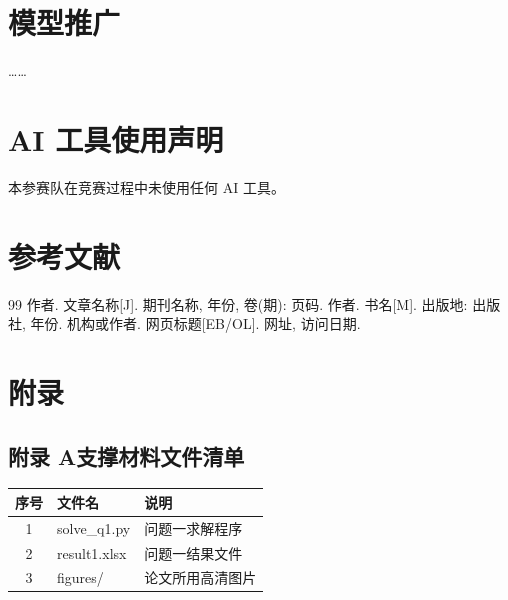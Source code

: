 \documentclass[12pt, a4paper]{ctexart}
\newcommand{\wuhao}{\fontsize{10.5pt}{13pt}\selectfont}  %
\begin{document}
\section{模型推广}
……

\section*{AI 工具使用声明}

本参赛队在竞赛过程中未使用任何 AI 工具。


\section*{参考文献}

{\songti\wuhao
\begin{thebibliography}{99}
  \setlength{\itemsep}{0pt}
   作者. 文章名称[J]. 期刊名称, 年份, 卷(期): 页码.
   作者. 书名[M]. 出版地: 出版社, 年份.
   机构或作者. 网页标题[EB/OL]. 网址, 访问日期.
\end{thebibliography}}

\newpage
\section*{附录}

\subsection*{附录 A\quad 支撑材料文件清单}

{\songti\wuhao
\begin{tabular}{cll}
  \toprule
  序号 & 文件名 & 说明 \\
  \midrule
  1 & solve\_q1.py & 问题一求解程序 \\
  2 & result1.xlsx & 问题一结果文件 \\
  3 & figures/ & 论文所用高清图片 \\
  \bottomrule
\end{tabular}}
\end{document}
